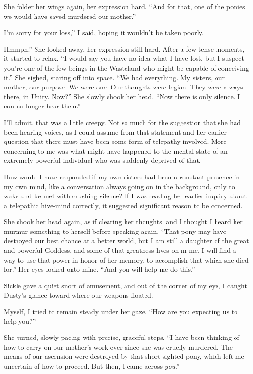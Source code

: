 She folder her wings again, her expression hard. “And for that, one of the ponies we would have saved murdered our mother.”

\leavevmode{}I’m sorry for your loss,” I said, hoping it wouldn’t be taken poorly.

\leavevmode{}Hmmph.” She looked away, her expression still hard. After a few tense moments, it started to relax. “I would say you have no idea what I have lost, but I suspect you’re one of the few beings in the Wasteland who might be capable of conceiving it.” She sighed, staring off into space. “We had everything. My sisters, our mother, our purpose. We were one. Our thoughts were legion. They were always there, in Unity. Now?” She slowly shook her head. “Now there is only silence. I can no longer hear them.”

I’ll admit, that was a little creepy. Not so much for the suggestion that she had been hearing voices, as I could assume from that statement and her earlier question that there must have been some form of telepathy involved. More concerning to me was what might have happened to the mental state of an extremely powerful individual who was suddenly deprived of that.

How would I have responded if my own sisters had been a constant presence in my own mind, like a conversation always going on in the background, only to wake and be met with crushing silence? If I was reading her earlier inquiry about a telepathic hive-mind correctly, it suggested significant reason to be concerned.

She shook her head again, as if clearing her thoughts, and I thought I heard her murmur something to herself before speaking again. “That pony may have destroyed our best chance at a better world, but I am still a daughter of the great and powerful Goddess, and some of that greatness lives on in me. I will find a way to use that power in honor of her memory, to accomplish that which she died for.” Her eyes locked onto mine. “And you will help me do this.”

Sickle gave a quiet snort of amusement, and out of the corner of my eye, I caught Dusty’s glance toward where our weapons floated.

Myself, I tried to remain steady under her gaze. “How are you expecting us to help you?”

She turned, slowly pacing with precise, graceful steps. “I have been thinking of how to carry on our mother’s work ever since she was cruelly murdered. The means of our ascension were destroyed by that short-sighted pony, which left me uncertain of how to proceed. But then, I came across \textit{you}.”

